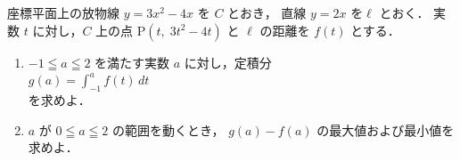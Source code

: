 ﻿\documentclass[../../../uem_tok_q.tex]{subfiles}
\begin{document}
    座標平面上の放物線 $y=3x^2-4x$ を $C$ とおき，%
    直線 $y=2x$ を$ \ell $ とおく．%
    実数 $t$ に対し，$C$ 上の点 $\mathrm{P}(t,\;3t^2-4t)$ と $\ell $ の距離を $f(t)$ とする．

    \begin{enumerate}
        \item $-1\leqq a\leqq 2$ を満たす実数 $a$ に対し，定積分\\
            \hspace{3\zw}%
            $\displaystyle%
                g(a)=\int_{-1}^{a}f(t)\,dt%
            $\\
            を求めよ．
        \item $a$ が $0\leqq a\leqq 2$ の範囲を動くとき，%
            $g(a)-f(a)$ の最大値および最小値を求めよ．
    \end{enumerate}
\end{document}
